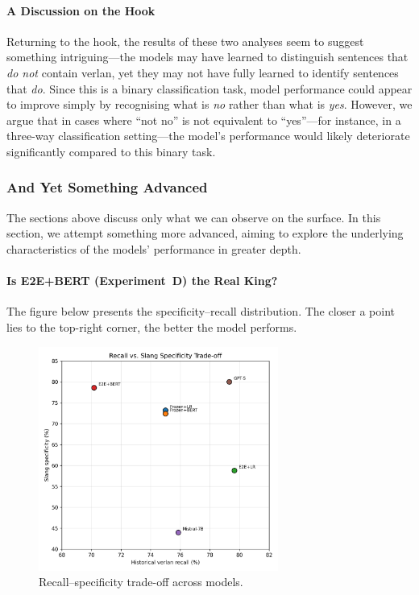 \documentclass[12pt]{article}
\begin{document}
\paragraph{A Discussion on the Hook}
Returning to the hook, the results of these two analyses seem to suggest something intriguing\;---\;the models may have learned to distinguish sentences that \textit{do not} contain verlan, yet they may not have fully learned to identify sentences that \textit{do}. 
Since this is a binary classification task, model performance could appear to improve simply by recognising what is \textit{no} rather than what is \textit{yes}. 
However, we argue that in cases where ``not no'' is not equivalent to ``yes''\;---\;for instance, in a three-way classification setting\;---\;the model's performance would likely deteriorate significantly compared to this binary task.

\subsubsection{And Yet Something Advanced}

The sections above discuss only what we can observe on the surface. 
In this section, we attempt something more advanced, aiming to explore the underlying characteristics of the models' performance in greater depth.

\paragraph{Is E2E+BERT (Experiment~D) the Real King?}

The figure below presents the specificity--recall distribution. 
The closer a point lies to the top-right corner, the better the model performs.

\begin{figure}[H]
    \centering
    \includegraphics[width=0.7\textwidth]{figures/historical_vs_slang_tradeoff.png}
    \caption{Recall--specificity trade-off across models.}
    \label{fig:tradeoff-scatter}
\end{figure}
\end{document}
